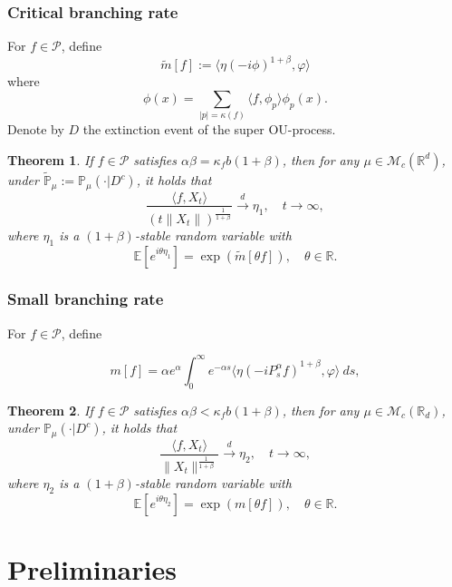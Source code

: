 \documentclass[12pt,a4paper]{amsart}
\theoremstyle{plain}
\newtheorem{thm}{Theorem}[section]
\theoremstyle{definition}
\numberwithin{equation}{section}
\begin{document}
\subsubsection{Critical branching rate}
    For $f\in \mathcal{P}$, define
\[
    \tilde{m}[f]
    := \langle \eta (-i\phi)^{1+\beta},\varphi\rangle
\]
    where
\[
    \phi(x)
    =\sum_{|p|=\kappa(f)}\langle f,\phi_p\rangle\phi_p(x).
\]
    Denote by $D$ the extinction event of the super OU-process.
\begin{thm}
\label{Theorem12}
    If $f\in\mathcal{P}$ satisfies  $\alpha\beta=\kappa_fb(1+\beta)$,
   then for any $\mu\in \mathcal M_c(\mathbb R^d)$, under
    $\tilde{\mathbb P}_\mu := \mathbb{P}_{\mu}(\cdot|D^c)$, it holds that
\[
    \frac{\langle f,X_t\rangle}{\left(t\|X_t\|\right)^{\frac{1}{1+\beta}}}
    \xrightarrow{d} \eta_1,
    \quad t\rightarrow \infty,
\]
    where $\eta_1$ is a $(1+\beta)$-stable random variable with
\[
    \mathbb{E} [e^{i\theta \eta_1}]
    =\exp(\tilde{m}[\theta f]),
    \quad \theta\in \mathbb R.
\]
\end{thm}

\subsubsection{Small branching rate}

For $f\in \mathcal{P}$, define

\[
     m[f]
    =\alpha e^{\alpha}\int_0^{\infty} e^{-\alpha s} \langle \eta (-iP_s^\alpha f)^{1+\beta}, \varphi \rangle~ds, \label{msmallcase}
\]
\begin{thm}
\label{Theorem13}
    If $f\in\mathcal{P}$ satisfies  $\alpha\beta<\kappa_f b(1+\beta)$,
   then for any $\mu\in \mathcal M_c(\mathbb R_d)$, under
    $\mathbb{P}_{\mu}(\cdot|D^c)$, it holds that
    $$\frac{\langle f,X_t\rangle}{\|X_t\|^{\frac{1}{1+\beta}}}\xrightarrow{d} \eta_2, \quad t\rightarrow \infty,$$
    where $\eta_2$ is a $(1+\beta)$-stable random variable with
    $$\mathbb{E} [e^{i\theta \eta_2}]=\exp(m[\theta f]), \quad \theta\in \mathbb R.$$
\end{thm}

\section{Preliminaries}
\end{document}

